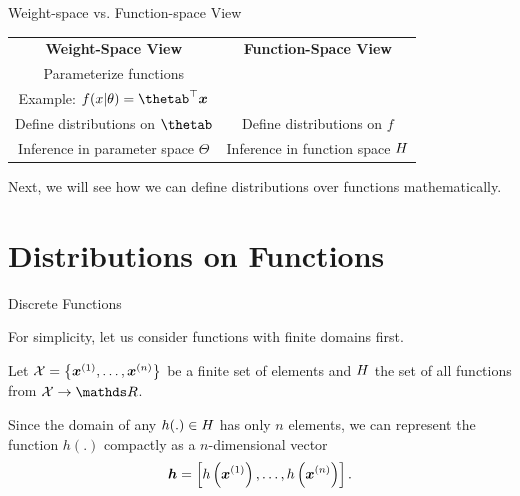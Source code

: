 \begin{frame}{Weight-space vs. Function-space View}

\begin{table}
  \begin{tabular}{cc}
  \textbf{Weight-Space View} & \textbf{Function-Space View} \vspace{4mm}\\ 
  Parameterize functions & \vspace{1mm}\\
  \footnotesize Example: $\fxt = \thetab^\top \xv$ & \vspace{3mm}\\
  Define distributions on $\thetab$ & Define distributions on $f$ \vspace{4mm}\\
  Inference in parameter space $\Theta$ & Inference in function space $H$
  \end{tabular}
\end{table}  

\lz

Next, we will see how we can define distributions over functions mathematically. 


\end{frame}

\section{Distributions on Functions}

\begin{vbframe}{Discrete Functions}

For simplicity, let us consider functions with finite domains first. 

\lz 


Let $\mathcal{X} = \left\{\bm{x}^{(1)}, \dots , \bm{x}^{(n)}\right\}$ be a finite set of elements and $H$ the set of all functions from $\mathcal{X} \to \R$.

\lz

Since the domain of any $h(.) \in H$ has only $n$ elements, we can represent the function $h(.)$ compactly as a $n$-dimensional vector $$\bm{h} = \left[h\left(\bm{x}^{(1)}\right), \dots, h\left(\bm{x}^{(n)}\right)\right].$$
\end{vbframe}




